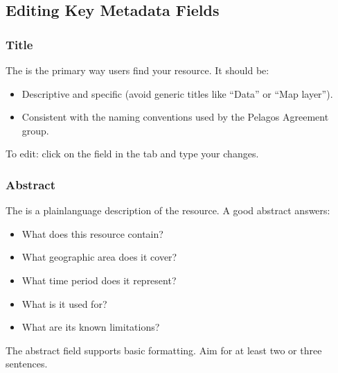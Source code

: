 \documentclass[letterpaper,10pt,english]{sphinxmanual}
\begin{document}
\subsection{Editing Key Metadata Fields}
\label{\detokenize{en/03_managing_metadata:editing-key-metadata-fields}}

\subsubsection{Title}
\label{\detokenize{en/03_managing_metadata:title}}
\sphinxAtStartPar
The  is the primary way users find your resource. It should be:
\begin{itemize}
\item {} 
\sphinxAtStartPar
Descriptive and specific (avoid generic titles like “Data” or “Map layer”).

\item {} 
\sphinxAtStartPar
Consistent with the naming conventions used by the Pelagos Agreement group.

\end{itemize}

\sphinxAtStartPar
To edit: click on the  field in the  tab and type your changes.


\subsubsection{Abstract}
\label{\detokenize{en/03_managing_metadata:abstract}}
\sphinxAtStartPar
The  is a plain\sphinxhyphen{}language description of the resource. A good abstract answers:
\begin{itemize}
\item {} 
\sphinxAtStartPar
What does this resource contain?

\item {} 
\sphinxAtStartPar
What geographic area does it cover?

\item {} 
\sphinxAtStartPar
What time period does it represent?

\item {} 
\sphinxAtStartPar
What is it used for?

\item {} 
\sphinxAtStartPar
What are its known limitations?

\end{itemize}

\sphinxAtStartPar
The abstract field supports basic formatting. Aim for at least two or three sentences.
\end{document}
